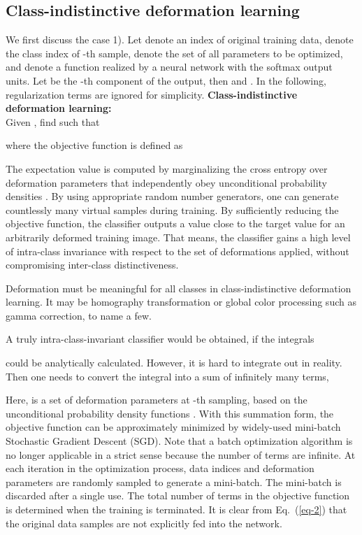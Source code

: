 \documentclass[10pt,twocolumn,letterpaper]{article}
\begin{document}
\subsection{Class-indistinctive deformation learning}

We first discuss the case 1). 
Let  denote an index of original training data, 
 denote the class index of -th sample,
 denote the set of all parameters to be optimized, and
 denote a function realized by a neural network with the softmax output units.
Let  be the -th component of the output, then
 and .
In the following, regularization terms are ignored for simplicity.
\newline
\newline
{\bf Class-indistinctive deformation learning:} \\
Given , find  such that

where the objective function  is defined as


The expectation value is computed by marginalizing the cross entropy over 
deformation parameters that independently obey unconditional probability
densities .
By using appropriate random number generators, one can generate countlessly many virtual samples during training.
By sufficiently reducing the objective function, 
the classifier outputs a value close to the target value for an arbitrarily deformed training image.
That means, the classifier gains a high level of intra-class invariance with respect to the set of deformations applied,
without compromising inter-class distinctiveness.

Deformation must be meaningful for all classes in class-indistinctive deformation learning.
It may be homography transformation or global color processing such as gamma correction, to name a few.

A truly intra-class-invariant classifier would be obtained, if the integrals

could be analytically calculated.
However, it is hard to integrate out in reality.
Then one needs to convert the integral into a sum of infinitely many terms,

Here,  is a set of deformation
parameters at -th sampling, based on
the unconditional probability density functions .
With this summation form, the objective function can be approximately minimized 
by widely-used mini-batch Stochastic Gradient Descent (SGD).
Note that a batch optimization algorithm is no longer applicable in a strict sense 
because the number of terms are infinite.
At each iteration in the optimization process, data indices and deformation parameters are randomly 
sampled to generate a mini-batch.
The mini-batch is discarded after a single use.
The total number of terms in the objective function is determined 
when the training is terminated.
It is clear from Eq.~(\ref{eq-2}) that the original data samples are not explicitly fed into the network.
\end{document}
